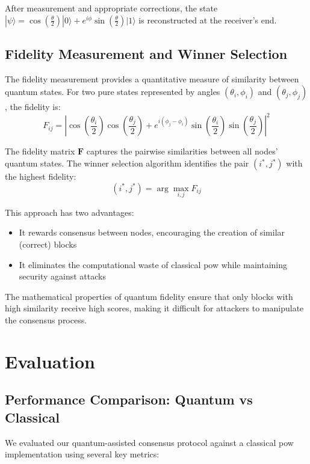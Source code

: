 \documentclass[11pt,a4paper]{article}
\begin{document}
After measurement and appropriate corrections, the state $|\psi\rangle = \cos\left(\frac{\theta}{2}\right)|0\rangle + e^{i\phi}\sin\left(\frac{\theta}{2}\right)|1\rangle$ is reconstructed at the receiver's end.

\subsection{Fidelity Measurement and Winner Selection}
The fidelity measurement provides a quantitative measure of similarity between quantum states. For two pure states represented by angles $(\theta_i, \phi_i)$ and $(\theta_j, \phi_j)$, the fidelity is:
\begin{equation}
F_{ij} = \left|\cos\left(\frac{\theta_i}{2}\right)\cos\left(\frac{\theta_j}{2}\right) + e^{i(\phi_j-\phi_i)}\sin\left(\frac{\theta_i}{2}\right)\sin\left(\frac{\theta_j}{2}\right)\right|^2
\end{equation}

The fidelity matrix $\mathbf{F}$ captures the pairwise similarities between all nodes' quantum states. The winner selection algorithm identifies the pair $(i^*, j^*)$ with the highest fidelity:
\begin{equation}
(i^*, j^*) = \arg\max_{i,j} F_{ij}
\end{equation}

This approach has two advantages:
\begin{itemize}
    \item It rewards consensus between nodes, encouraging the creation of similar (correct) blocks
    \item It eliminates the computational waste of classical \gls{pow} while maintaining security against attacks
\end{itemize}

The mathematical properties of quantum fidelity ensure that only blocks with high similarity receive high scores, making it difficult for attackers to manipulate the consensus process.

\section{Evaluation}

\subsection{Performance Comparison: Quantum vs Classical}
We evaluated our quantum-assisted consensus protocol against a classical \gls{pow} implementation using several key metrics:
\end{document}
